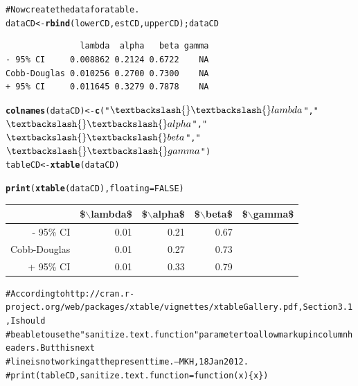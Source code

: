 \documentclass[10pt]{article}\usepackage{graphicx, color}
\makeatletter
\newcommand{\hlfunctioncall}[1]{\textcolor[rgb]{0.501960784313725,0,0.329411764705882}{\textbf{#1}}}%
\newcommand{\hlstring}[1]{\textcolor[rgb]{0.6,0.6,1}{#1}}%
\newcommand{\hlcomment}[1]{\textcolor[rgb]{0.180392156862745,0.6,0.341176470588235}{#1}}%
\newenvironment{kframe}{%
 \def\at@end@of@kframe{}%
 \ifinner\ifhmode%
  \def\at@end@of@kframe{\end{minipage}}%
  \begin{minipage}{\columnwidth}%
 \fi\fi%
 \def\FrameCommand##1{\hskip\@totalleftmargin \hskip-\fboxsep
 \colorbox{shadecolor}{##1}\hskip-\fboxsep
     \hskip-\linewidth \hskip-\@totalleftmargin \hskip\columnwidth}%
 \MakeFramed {\advance\hsize-\width
   \@totalleftmargin\z@ \linewidth\hsize
   \@setminipage}}%
 {\par\unskip\endMakeFramed%
 \at@end@of@kframe}
\newenvironment{knitrout}{}{} %
\makeatother
\begin{document}
\begin{knitrout}
\begin{kframe}
\begin{alltt}
\hlcomment{# Now create the data for a table.}
dataCD <- \hlfunctioncall{rbind}(lowerCD, estCD, upperCD); dataCD
\end{alltt}
\begin{verbatim}
               lambda  alpha   beta gamma
- 95% CI     0.008862 0.2124 0.6722    NA
Cobb-Douglas 0.010256 0.2700 0.7300    NA
+ 95% CI     0.011645 0.3279 0.7878    NA
\end{verbatim}
\begin{alltt}
\hlfunctioncall{colnames}(dataCD)  <- \hlfunctioncall{c}(\hlstring{"$\textbackslash{}\textbackslash{}lambda$"}, \hlstring{"$\textbackslash{}\textbackslash{}alpha$"}, \hlstring{"$\textbackslash{}\textbackslash{}beta$"}, \hlstring{"$\textbackslash{}\textbackslash{}gamma$"})
tableCD  <- \hlfunctioncall{xtable}(dataCD)
\end{alltt}


{\ttfamily\noindent\color{warningcolor}{Warning: provided 3 variables to replace 1 variables}}\end{kframe}
\end{knitrout}


\begin{kframe}
\begin{alltt}
\hlfunctioncall{print}(\hlfunctioncall{xtable}(dataCD), floating=FALSE)
\end{alltt}
\end{kframe}%
\begin{tabular}{rrrrl}
  \hline
 & \$$\backslash$lambda\$ & \$$\backslash$alpha\$ & \$$\backslash$beta\$ & \$$\backslash$gamma\$ \\ 
  \hline
- 95\% CI & 0.01 & 0.21 & 0.67 &  \\ 
  Cobb-Douglas & 0.01 & 0.27 & 0.73 &  \\ 
  + 95\% CI & 0.01 & 0.33 & 0.79 &  \\ 
   \hline
\end{tabular}
\begin{kframe}\begin{alltt}
\hlcomment{# According to http://cran.r-project.org/web/packages/xtable/vignettes/xtableGallery.pdf, Section 3.1, I should }
\hlcomment{# be able to use the "sanitize.text.function" parameter to allow markup in column headers. But this next}
\hlcomment{# line is not working at the present time. --MKH, 18 Jan 2012.}
\hlcomment{# print(tableCD, sanitize.text.function = function(x)\{x\})}
\end{alltt}
\end{kframe}
\end{document}
